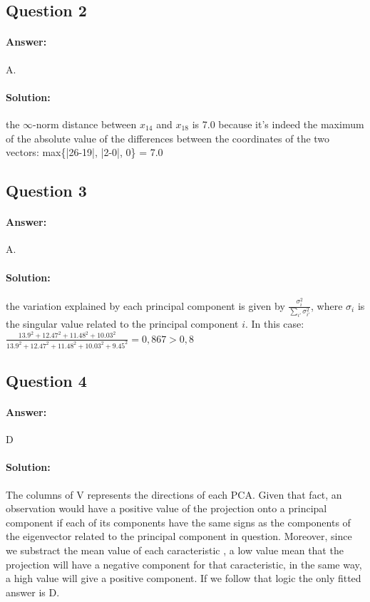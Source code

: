 \documentclass[11pt,a4paper]{article}
\begin{document}
\subsection{Question 2}

\paragraph*{Answer:} A.
\paragraph*{Solution:} the $\infty$-norm distance between $x_{14}$ and $x_{18}$ is 7.0 because it's indeed the maximum of the absolute value of the differences between the coordinates of the two vectors: max\{|26-19|, |2-0|, 0\} = 7.0


\subsection{Question 3}

\paragraph*{Answer:} A.
\paragraph*{Solution:} the variation explained by each principal component is given by $\frac{\sigma_i^2}{\sum_{i'} \sigma_{i'}^2}$, where $\sigma_i$ is the singular value related to the principal component $i$. In this case: $\frac{13.9^2+12.47^2+11.48^2+10.03^2}{13.9^2+12.47^2+11.48^2+10.03^2+9.45^2} = 0,867 > 0,8$

\subsection{Question 4}

\paragraph*{Answer:} D
\paragraph*{Solution:}  The columns of V represents the directions of each PCA. Given that fact, an observation would have a positive value of the projection onto a
principal component if each of its components have the same signs as the components of the eigenvector related to the principal component in question. Moreover, since we substract the mean value of each caracteristic , a low value mean that the projection will have a negative component for that caracteristic, in the same way, a high value will give a positive component. If we follow that logic the only fitted answer is D.
\end{document}
